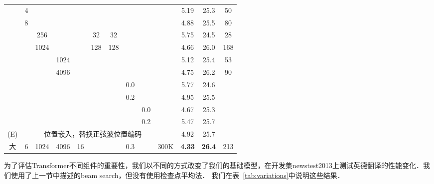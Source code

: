 \begin{table}[t]
\begin{center}
\begin{tabular}{c|ccccccccc|ccc}
& 4 & & & & & & & &            & 5.19 & 25.3 & 50 \\
& 8 & & & & & & & &            & 4.88 & 25.5 & 80 \\
& & 256 & & & 32 & 32 & & &    & 5.75 & 24.5 & 28 \\
& & 1024 & & & 128 & 128 & & & & 4.66 & 26.0 & 168 \\
& & & 1024 & & & & & &         & 5.12 & 25.4 & 53 \\
& & & 4096 & & & & & &         & 4.75 & 26.2 & 90 \\
\hline\rule{0pt}{2.0ex}
\multirow{4}{*}{(D)}
& & & & & & & 0.0 & & & 5.77 & 24.6 &  \\
& & & & & & & 0.2 & & & 4.95 & 25.5 &  \\
& & & & & & & & 0.0 & & 4.67 & 25.3 &  \\
& & & & & & & & 0.2 & & 5.47 & 25.7 &  \\
\hline\rule{0pt}{2.0ex}
(E) & & \multicolumn{7}{c}{位置嵌入，替换正弦波位置编码} & & 4.92 & 25.7 & \\
\hline\rule{0pt}{2.0ex}
大 & 6 & 1024 & 4096 & 16 & & & 0.3 & & 300K & \textbf{4.33} & \textbf{26.4} & 213 \\
\hline
\end{tabular}
\end{center}
\end{table}




为了评估Transformer不同组件的重要性，我们以不同的方式改变了我们的基础模型，在开发集newstest2013上测试英德翻译的性能变化．我们使用了上一节中描述的beam search，但没有使用检查点平均法． 我们在表~\ref{tab:variations}中说明这些结果．

